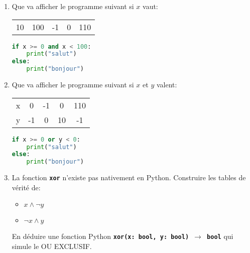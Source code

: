 \documentclass[a4paper,11pt]{article}
\begin{document}
\begin{exo}
\begin{enumerate}
    \item Que va afficher le programme suivant si $x$ vaut:
    \begin{center}
        \begin{tabular}{*{5}{c}}
            10&100&-1&0&110\\
        \end{tabular}
    \end{center}
    \begin{lstlisting}[language=Python  , xleftmargin=2em, xrightmargin=2em]
if x >= 0 and x < 100:
    print("salut")
else:
    print("bonjour")
\end{lstlisting}
\item Que va afficher le programme suivant si $x$ et $y$ valent:
    \begin{center}
        \begin{tabular}{|*{5}{c|}}
            \hline
            x&0&-1&0&110\\
            y&-1&0&10&-1\\
            \hline
        \end{tabular}
    \end{center}
    \begin{lstlisting}[language=Python  , xleftmargin=2em, xrightmargin=2em]
if x >= 0 or y < 0:
    print("salut")
else:
    print("bonjour")
\end{lstlisting}
\item La fonction \textbf{\texttt{xor}} n'existe pas nativement en Python. Construire les tables de vérité de:
\begin{itemize}
    \item $x \land \lnot y$
    \item $\lnot x \land y$
\end{itemize}
En déduire une fonction Python \textbf{\texttt{xor(x: bool, y: bool) $\rightarrow$ bool}} qui simule le OU EXCLUSIF.
\end{enumerate}
\end{exo}
\end{document}
